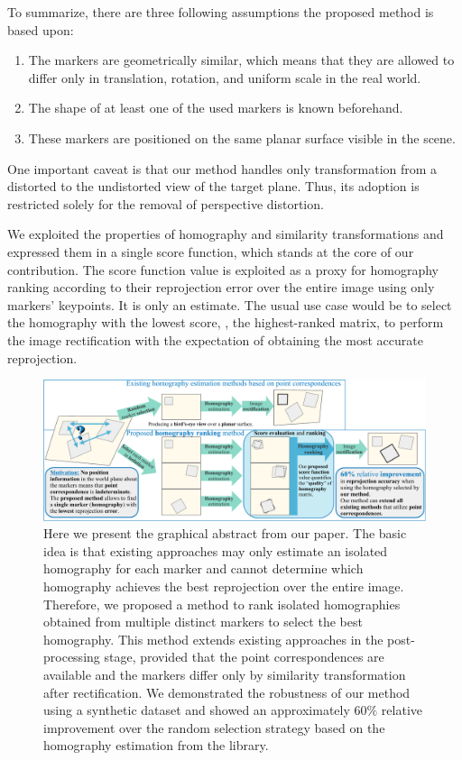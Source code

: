 To summarize, there are three following assumptions the proposed method is based upon:
\begin{enumerate}
    \item The markers are geometrically similar, which means that they are allowed to differ only in translation, rotation, and uniform scale in the real world.
    \item The shape of at least one of the used markers is known beforehand.
    \item These markers are positioned on the same planar surface visible in the scene.
\end{enumerate}
One important caveat is that our method handles only transformation from a distorted to the undistorted view of the target plane. Thus, its adoption is restricted solely for the removal of perspective distortion.

We exploited the properties of homography and similarity transformations and expressed them in a single score function, which stands at the core of our contribution. The score function value is exploited as a proxy for homography ranking according to their reprojection error over the entire image using only markers' keypoints. It is only an estimate. The usual use case would be to select the homography with the lowest score, \ietext{}, the highest-ranked matrix, to perform the image rectification with the expectation of obtaining the most accurate reprojection.

\begin{figure}[t]
    \centerline{\includegraphics[width=\linewidth]{figures/homography/graphical_abstract.pdf}}
    \caption[Graphical abstract for homography ranking]{Here we present the graphical abstract from our paper. The basic idea is that existing approaches may only estimate an isolated homography for each marker and cannot determine which homography achieves the best reprojection over the entire image. Therefore, we proposed a method to rank isolated homographies obtained from multiple distinct markers to select the best homography. This method extends existing approaches in the post-processing stage, provided that the point correspondences are available and the markers differ only by similarity transformation after rectification. We demonstrated the robustness of our method using a synthetic dataset and showed an approximately $60\%$ relative improvement over the random selection strategy based on the homography estimation from the \opencv{} library.}
    \label{fig:GraphicalAbstract}
\end{figure}

